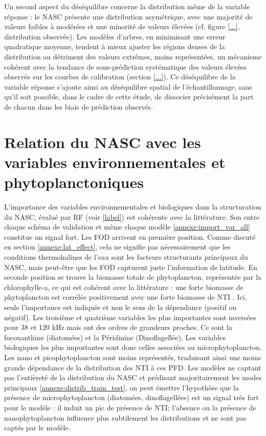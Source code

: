 Un second aspect du déséquilibre concerne la distribution même de la variable réponse : le NASC présente une distribution asymétrique, avec une majorité de valeurs faibles à modérées et une minorité de valeurs élevées (cf. figure \ref{...}, distribution observée). Les modèles d'arbres, en minimisant une erreur quadratique moyenne, tendent à mieux ajuster les régions denses de la distribution au détriment des valeurs extrêmes, moins représentées, un mécanisme cohérent avec la tendance de sous-prédiction systématique des valeurs élevées observée sur les courbes de calibration (section \ref{...}). Ce déséquilibre de la variable réponse s'ajoute ainsi au déséquilibre spatial de l'échantillonnage, sans qu'il soit possible, dans le cadre de cette étude, de dissocier précisément la part de chacun dans les biais de prédiction observés.

\section{Relation du NASC avec les variables environnementales et phytoplanctoniques}
L'importance des variables environnementales et biologiques dans la structuration du NASC, évalué par RF (voir \ref{label}) est cohérente avec la littérature. Son entre chaque schéma de validation et même chaque modèle \ref{annexe:import_var_all} constitue un signal fort. Les FOD arrivent en première position. Comme discuté en section \ref{annexe:lat_effect}, cela ne signifie pas nécessairement que les conditions thermohalines de l'eau sont les facteurs structurants principaux du NASC, mais peut-être que les FOD capturent juste l'information de latitude. En seconde position se trouve la biomasse totale de phytoplancton, représentée par la chlorophylle-a, ce qui est cohérent avec la littérature : une forte biomasse de phytoplancton est corrélée positivement avec une forte biomasse de NTI \cite{bibid}. Ici, seule l'importance est indiquée et non le sens de la dépendance (positif ou négatif). Les troisième et quatrième variables les plus importantes sont inversées pour 38 et 120 kHz mais ont des ordres de grandeurs proches. Ce sont la fucoxanthine (diatomées) et la Péridinine (Dinoflagellée). Les variables biologiques les plus importantes sont donc celles associées au microphytoplancton. Les nano et picophytoplancton sont moins représentés, traduisant ainsi une moins grande dépendance de la distribution des NTI à ces PFD. Les modèles ne captant pas l'entièreté de la distribution du NASC et prédisant majoritairement les modes principaux \ref{annexe:distrib_train_test}, on peut émettre l'hypothèse que la présence de microphytoplancton (diatomées, dinoflagellées) est un signal très fort pour le modèle : il induit un pic de présence de NTI; l'absence ou la présence de nanophytoplancton influence plus subtilement les distributions et ne sont pas captés par le modèle. 

